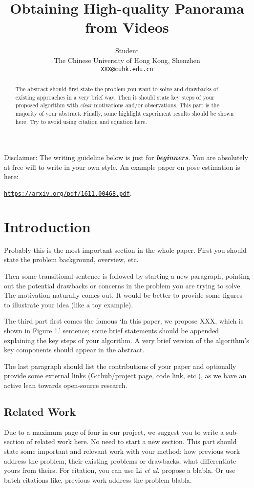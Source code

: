 \documentclass{article}
\title{Obtaining High-quality Panorama from Videos}
\author{
  Student \\
  The Chinese University of Hong Kong, Shenzhen\\
  \texttt{XXX@cuhk.edu.cn} \\
   \And
}
\begin{document}
\maketitle

\begin{abstract}
  The abstract should first state the problem you want to solve and drawbacks of existing approaches in a very brief way. Then it should state key steps of your proposed algorithm with \textit{clear} motivations and/or observations. This part is the majority of your abstract. Finally, some highlight experiment results should be shown here. Try to avoid using citation and equation here.
\end{abstract}


Disclaimer: The writing guideline below is just for \textbf{\textit{beginners}}. You are absolutely at free will to write in your own style.
%
An example paper on pose estimation is here:

 \href{https://arxiv.org/pdf/1611.00468.pdf}{\texttt{https://arxiv.org/pdf/1611.00468.pdf}}.

\section{Introduction}

Probably this is the most important section in the whole paper. First you should state the problem background, overview, etc.

Then some transitional sentence is followed by starting a new paragraph, pointing out the potential drawbacks or concerns in the problem you are trying to solve. The motivation  naturally comes out. It would be better to provide some figures to illustrate your idea (like a toy example).

The third part first comes the famous `In this paper, we propose XXX, which is shown in Figure 1.' sentence; some brief statements should be appended explaining the key steps of your algorithm. A very brief version of the algorithm's key components should appear in the abstract.

The last paragraph should list the contributions of your paper and optionally provide some external links (Github/project page, code link, etc.), as we have an active lean towards open-source research.

\subsection{Related Work}
Due to a maximum page of four in our project, we suggest you to write a sub-section of related work here. No need to start a new section. This part should state some important and relevant work with your method: how previous work address the problem, their existing problems or drawbacks, what differentiate yours from theirs. For citation, you can use Li \textit{et al.} \cite{MCG} propose a blabla. Or use batch citations like, previous work \cite{bing,scale_aware,Hosang2015Pami} address the problem blabla.
\end{document}
